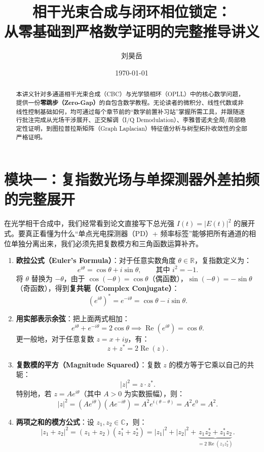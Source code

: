 \documentclass[UTF8, a4paper, 11pt]{ctexart}
\title{\textbf{相干光束合成与闭环相位锁定：\\从零基础到严格数学证明的完整推导讲义}}
\author{刘昊岳}
\date{\today}
\newcommand{\R}{\mathbb{R}}
\newcommand{\C}{\mathbb{C}}
\begin{document}
\maketitle

\begin{abstract}
本讲义针对多通道相干光束合成（CBC）与光学锁相环（OPLL）中的核心数学问题，提供一份\textbf{零跳步（Zero-Gap）}的自包含数学教程。无论读者的微积分、线性代数或非线性控制基础如何，均可通过每个章节前的“数学前置补习站”掌握所需工具，并跟随逐行批注完成从光场干涉展开、正交解调（I/Q Demodulation）、李雅普诺夫全局/局部稳定性证明，到图拉普拉斯矩阵（Graph Laplacian）特征值分析与树型拓扑收敛性的全部严格证明。
\end{abstract}

\newpage
\tableofcontents
\newpage

\section{模块一：复指数光场与单探测器外差拍频的完整展开}

在光学相干合成中，我们经常看到论文直接写下总光强 $I(t) = |E(t)|^2$ 的展开式。要真正看懂为什么“单点光电探测器（PD）+ 频率标签”能够把所有通道的相位单独分离出来，我们必须先把复数模方和三角函数运算补齐。

\begin{mathprep}
\begin{enumerate}[label=\textbf{\arabic*.}]
    \item \textbf{欧拉公式（Euler's Formula）}：对于任意实数角度 $\theta \in \R$，复指数定义为：
    \[
        e^{i\theta} = \cos\theta + i\sin\theta, \qquad \text{其中 } i^2 = -1.
    \]
    将 $\theta$ 替换为 $-\theta$，由于 $\cos(-\theta)=\cos\theta$（偶函数），$\sin(-\theta)=-\sin\theta$（奇函数），得到\textbf{复共轭（Complex Conjugate）}：
    \[
        \left(e^{i\theta}\right)^* = e^{-i\theta} = \cos\theta - i\sin\theta.
    \]
    \item \textbf{用实部表示余弦}：把上面两式相加：
    \[
        e^{i\theta} + e^{-i\theta} = 2\cos\theta \implies \operatorname{Re}\left(e^{i\theta}\right) = \cos\theta.
    \]
    更一般地，对于任意复数 $z = x + iy$，有：
    \[
        z + z^* = 2\operatorname{Re}(z).
    \]
    \item \textbf{复数模的平方（Magnitude Squared）}：复数 $z$ 的模方等于它乘以自己的共轭：
    \[
        |z|^2 = z \cdot z^*.
    \]
    特别地，若 $z = A e^{i\theta}$（其中 $A > 0$ 为实数振幅），则：
    \[
        |z|^2 = \left(A e^{i\theta}\right)\left(A e^{-i\theta}\right) = A^2 e^{i(\theta - \theta)} = A^2 e^0 = A^2.
    \]
    \item \textbf{两项之和的模方公式}：设 $z_1, z_2 \in \C$，则：
    \[
        |z_1 + z_2|^2 = (z_1 + z_2)(z_1^* + z_2^*) = |z_1|^2 + |z_2|^2 + \underbrace{z_1 z_2^* + z_1^* z_2}_{= 2\operatorname{Re}(z_1 z_2^*)}.
    \]
\end{enumerate}
\end{mathprep}
\end{document}
